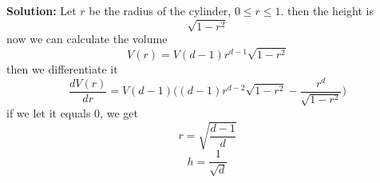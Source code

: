 \documentclass[a4paper, 12pt]{mcshw}
\begin{document}
\begin{enumerate}
            \textbf{Solution:} Let $r$ be the radius of the cylinder, $0 \leq r \leq 1$.
            then the height is
            $$
            \sqrt{1-r^2}
            $$
            now we can calculate the volume
            $$
            V(r)=V(d-1)r^{d-1}\sqrt{1-r^2}
            $$
            then we differentiate it
            $$
            \frac{dV(r)}{dr}=V(d-1)\Big((d-1)r^{d-2}\sqrt{1-r^2}-\frac{r^d}{\sqrt{1-r^2}}\Big)
            $$
            if we let it equals 0, we get
            $$
            r=\sqrt{\frac{d-1}{d}} 
            $$
            $$
            h=\frac{1}{\sqrt{d}}
        $$
        
    \end{enumerate}
\end{document}
